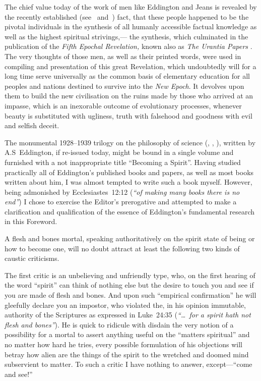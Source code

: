 \documentclass[12pt]{book}
\begin{document}
The chief value today of the work of men like Eddington and Jeans is revealed by the recently established
(see~\cite{Block1} and~\cite{Aivazian1}) fact, that these people happened to be the pivotal individuals
in the synthesis of all humanly accessible factual knowledge as well as the highest spiritual strivings,---
the synthesis, which culminated in the publication of the \emph{Fifth Epochal Revelation,} known also as
\emph{The Urantia Papers} \cite{Aivazian1}.
The very thoughts of those men, as well as their printed words, were used in compiling and presentation of this
great Revelation, which undoubtedly will for a long time serve universally as the common basis of
elementary education for all peoples and nations destined to survive into the \emph{New Epoch}.
It devolves upon them to build the new civilisation on the ruins made by those who arrived at an impasse,
which is an inexorable outcome of evolutionary processes, whenever beauty is substituted with ugliness,
truth with falsehood and goodness with evil and selfish deceit.

The monumental 1928--1939 trilogy on the philosophy of science (\cite{Eddington1}, \cite{Eddington2}, \cite{Eddington3}),
written by A.S~Eddington, if re-issued today, might be bound in a single volume and furnished with
a not inappropriate title ``Becoming a Spirit''.
Having studied practically all of Eddington's published books and papers, as well as most books written about him,
I was almost tempted to write such a book myself.
However, being admonished by Ecclesiastes~12:12 (\emph{``of making many books there is no end''}) I chose to exercise the
Editor's prerogative and attempted to make a clarification and qualification of the essence of Eddington's
fundamental research in this Foreword.

A flesh and bones mortal, speaking authoritatively on the spirit state of being or how to become one, will no doubt
attract at least the following two kinds of caustic criticisms.

The first critic is an unbelieving and unfriendly type, who, on the first hearing of the word ``spirit''
can think of nothing else but the desire to touch you and see if you are made of flesh and bones.
And upon such ``empirical confirmation'' he will gleefully declare you an impostor, who violated the,
in his opinion immutable, authority of the Scriptures as expressed in Luke~24:35 (\emph{``\ldots\ for a spirit hath not flesh and bones''}).
He is quick to ridicule with disdain the very notion of a possibility for a mortal to assert anything useful on the ``matters spiritual''
and no matter how hard he tries, every possible formulation of his objections will betray how alien are the things of the spirit
to the wretched and doomed mind subservient to matter.
To such a critic I have nothing to answer, except---``come and see!''
\end{document}
